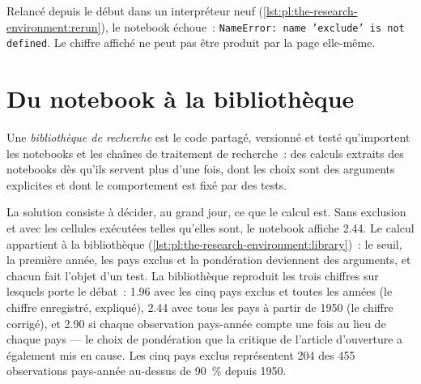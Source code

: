Relancé depuis le début dans un interpréteur neuf (\cref{lst:pl:the-research-environment:rerun}), le notebook échoue~:
\texttt{NameError: name 'exclude' is not defined}. Le chiffre affiché ne peut pas être produit par la page elle-même.

\label{lst:pl:the-research-environment:rerun}

\section{Du notebook à la bibliothèque}

\begin{definition}\label{def:pl:the-research-environment:library}
Une \emph{bibliothèque de recherche} est le code partagé, versionné et testé qu'importent les notebooks et les chaînes de traitement de recherche~:
des calculs extraits des notebooks dès qu'ils servent plus d'une fois, dont les choix sont des arguments explicites et dont le comportement
est fixé par des tests.
\end{definition}

La solution consiste à décider, au grand jour, ce que le calcul est. Sans exclusion et avec les cellules exécutées telles qu'elles sont, le notebook affiche 2.44. Le
calcul appartient à la bibliothèque (\cref{lst:pl:the-research-environment:library})~: le seuil, la première année, les pays exclus et
la pondération deviennent des arguments, et chacun fait l'objet d'un test. La bibliothèque reproduit les trois chiffres sur lesquels porte le débat~: 1.96 avec les cinq pays
exclus et toutes les années (le chiffre enregistré, expliqué), 2.44 avec tous les pays à partir de 1950 (le chiffre corrigé), et 2.90 si chaque
observation pays-année compte une fois au lieu de chaque pays --- le choix de pondération que la critique de l'article d'ouverture a également mis en cause. Les cinq pays exclus
représentent 204 des 455 observations pays-année au-dessus de 90~\% depuis 1950.

